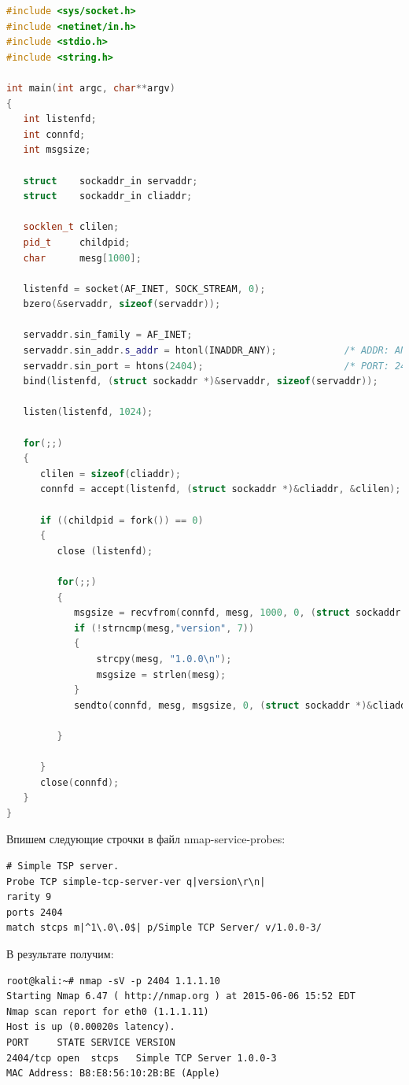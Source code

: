\documentclass[utf8x, 12pt]{G7-32}
\begin{document}
\begin{lstlisting}[language=C++]
#include <sys/socket.h>
#include <netinet/in.h>
#include <stdio.h>
#include <string.h>

int main(int argc, char**argv)
{
   int listenfd;
   int connfd;
   int msgsize;

   struct    sockaddr_in servaddr;
   struct    sockaddr_in cliaddr;

   socklen_t clilen;
   pid_t     childpid;
   char      mesg[1000];

   listenfd = socket(AF_INET, SOCK_STREAM, 0);
   bzero(&servaddr, sizeof(servaddr));

   servaddr.sin_family = AF_INET;
   servaddr.sin_addr.s_addr = htonl(INADDR_ANY);            /* ADDR: ANY! */
   servaddr.sin_port = htons(2404);                         /* PORT: 2404 */
   bind(listenfd, (struct sockaddr *)&servaddr, sizeof(servaddr));

   listen(listenfd, 1024);

   for(;;)
   {
      clilen = sizeof(cliaddr);
      connfd = accept(listenfd, (struct sockaddr *)&cliaddr, &clilen);

      if ((childpid = fork()) == 0)
      {
         close (listenfd);

         for(;;)
         {
            msgsize = recvfrom(connfd, mesg, 1000, 0, (struct sockaddr *)&cliaddr, &clilen);
            if (!strncmp(mesg,"version", 7))
            {
                strcpy(mesg, "1.0.0\n");
                msgsize = strlen(mesg);
            }
            sendto(connfd, mesg, msgsize, 0, (struct sockaddr *)&cliaddr, sizeof(cliaddr));
            
         }
         
      }
      close(connfd);
   }
}
\end{lstlisting}


Впишем следующие строчки в файл nmap-service-probes:

\begin{lstlisting}
# Simple TSP server.
Probe TCP simple-tcp-server-ver q|version\r\n|
rarity 9
ports 2404
match stcps m|^1\.0\.0$| p/Simple TCP Server/ v/1.0.0-3/
\end{lstlisting}

В результате получим:


\begin{lstlisting}
root@kali:~# nmap -sV -p 2404 1.1.1.10
Starting Nmap 6.47 ( http://nmap.org ) at 2015-06-06 15:52 EDT
Nmap scan report for eth0 (1.1.1.11)
Host is up (0.00020s latency).
PORT     STATE SERVICE VERSION
2404/tcp open  stcps   Simple TCP Server 1.0.0-3
MAC Address: B8:E8:56:10:2B:BE (Apple)
\end{lstlisting}
\end{document}
